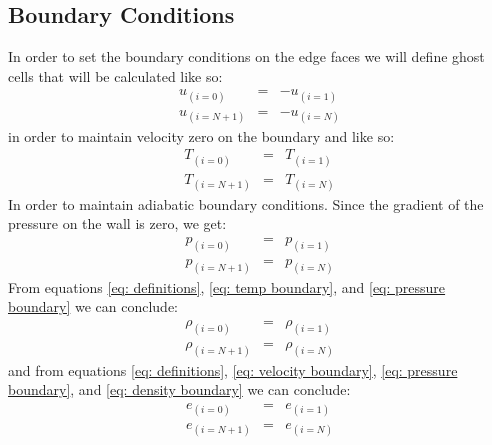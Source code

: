 \documentclass[11pt, a4paper]{article}
\begin{document}
\subsection{Boundary Conditions}
In order to set the boundary conditions on the edge faces we will define ghost cells that will be calculated like so:
\begin{equation}
    \begin{array}{lcl}
        u_{\left(i=0\right)} &=& -u_{\left(i=1\right)} \\
        u_{\left(i=N+1\right)} &=& -u_{\left(i=N\right)}
    \end{array}
    \label{eq: velocity boundary}
\end{equation}
in order to maintain velocity zero on the boundary and like so:
\begin{equation}
    \begin{array}{lcl}
        T_{\left(i=0\right)} &=& T_{\left(i=1\right)} \\
        T_{\left(i=N+1\right)} &=& T_{\left(i=N\right)}
    \end{array}
    \label{eq: temp boundary}
\end{equation}
In order to maintain adiabatic boundary conditions.
Since the gradient of the pressure on the wall is zero, we get:
\begin{equation}
    \begin{array}{lcl}
        p_{\left(i=0\right)} &=& p_{\left(i=1\right)} \\
        p_{\left(i=N+1\right)} &=& p_{\left(i=N\right)}
    \end{array}
    \label{eq: pressure boundary}
\end{equation}
From equations \ref{eq: definitions}, \ref{eq: temp boundary}, and \ref{eq: pressure boundary} we can conclude:
\begin{equation}
    \begin{array}{lcl}
        \rho_{\left(i=0\right)} &=& \rho_{\left(i=1\right)} \\
        \rho_{\left(i=N+1\right)} &=& \rho_{\left(i=N\right)}
    \end{array}
    \label{eq: density boundary}
\end{equation}
and from equations \ref{eq: definitions}, \ref{eq: velocity boundary}, \ref{eq: pressure boundary}, and \ref{eq: density boundary} we can conclude:
\begin{equation}
    \begin{array}{lcl}
        e_{\left(i=0\right)} &=& e_{\left(i=1\right)} \\
        e_{\left(i=N+1\right)} &=& e_{\left(i=N\right)}
    \end{array}
    \label{eq: energy boundary}
\end{equation}
\end{document}
